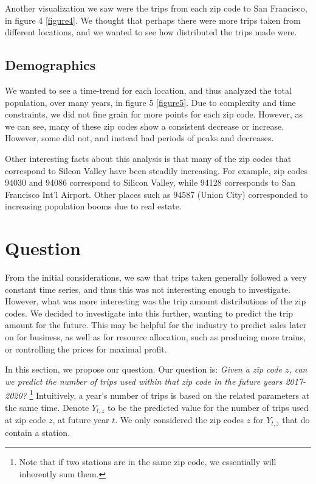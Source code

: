 \documentclass[12pt,twoside]{article}
\begin{document}
Another visualization we saw were the trips from each zip code to San Francisco, in figure 4 \ref{figure4}. We thought that perhaps there were more trips taken from different locations, and we wanted to see how distributed the trips made were. 
\subsection{Demographics} 
We wanted to see a time-trend for each location, and thus analyzed the total population, over many years, in figure 5 \ref{figure5}. Due to complexity and time constraints, we did not fine grain for more points for each zip code. However, as we can see, many of these zip codes show a consistent decrease or increase. However, some did not, and instead had periods of peaks and decreases. 

Other interesting facts about this analysis is that many of the zip codes that correspond to Silcon Valley have been steadily increasing. For example, zip codes 94030 and 94086 correspond to Silicon Valley, while 94128 corresponds to San Francisco Int'l Airport. Other places such as 94587 (Union City) corresponded to increasing population booms due to real estate.  


\section{Question} 
From the initial considerations, we saw that trips taken generally followed a very constant time series, and thus this was not interesting enough to investigate. However, what was more interesting was the trip amount distributions of the zip codes. We decided to investigate into this further, wanting to predict the trip amount for the future. This may be helpful for the industry to predict sales later on for business, as well as for resource allocation, such as producing more trains, or controlling the prices for maximal profit. 

In this section, we propose our question. Our question is: \textit{Given a zip code $z$, can we predict the number of trips used within that zip code in the future years 2017-2020? } \footnote{Note that if two stations are in the same zip code, we essentially will inherently sum them.}  Intuitively, a year's number of trips is based on the related parameters at the same time. Denote $Y_{t,z}$ to be the predicted value for the number of trips used at zip code $z$, at future year $t$. We only considered the zip codes $z$ for $Y_{t,z}$ that do contain a station. 
\end{document}
